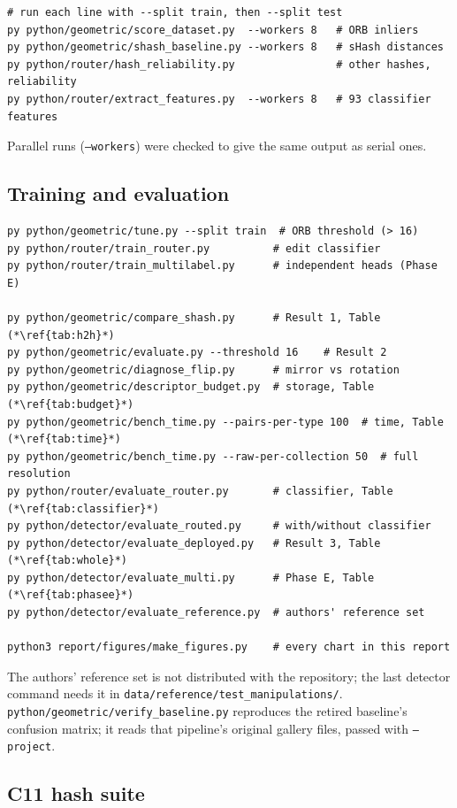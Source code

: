 \begin{lstlisting}
# run each line with --split train, then --split test
py python/geometric/score_dataset.py  --workers 8   # ORB inliers
py python/geometric/shash_baseline.py --workers 8   # sHash distances
py python/router/hash_reliability.py                # other hashes, reliability
py python/router/extract_features.py  --workers 8   # 93 classifier features
\end{lstlisting}
Parallel runs (\texttt{--workers}) were checked to give the same output as serial ones.

\subsection{Training and evaluation}

\begin{lstlisting}
py python/geometric/tune.py --split train  # ORB threshold (> 16)
py python/router/train_router.py          # edit classifier
py python/router/train_multilabel.py      # independent heads (Phase E)

py python/geometric/compare_shash.py      # Result 1, Table (*\ref{tab:h2h}*)
py python/geometric/evaluate.py --threshold 16    # Result 2
py python/geometric/diagnose_flip.py      # mirror vs rotation
py python/geometric/descriptor_budget.py  # storage, Table (*\ref{tab:budget}*)
py python/geometric/bench_time.py --pairs-per-type 100  # time, Table (*\ref{tab:time}*)
py python/geometric/bench_time.py --raw-per-collection 50  # full resolution
py python/router/evaluate_router.py       # classifier, Table (*\ref{tab:classifier}*)
py python/detector/evaluate_routed.py     # with/without classifier
py python/detector/evaluate_deployed.py   # Result 3, Table (*\ref{tab:whole}*)
py python/detector/evaluate_multi.py      # Phase E, Table (*\ref{tab:phasee}*)
py python/detector/evaluate_reference.py  # authors' reference set

python3 report/figures/make_figures.py    # every chart in this report
\end{lstlisting}
The authors' reference set is not distributed with the repository; the last detector command
needs it in \texttt{data/reference/test\_manipulations/}.
\texttt{python/geometric/verify\_baseline.py} reproduces the retired baseline's confusion
matrix; it reads that pipeline's original gallery files, passed with \texttt{--project}.

\subsection{C11 hash suite}

